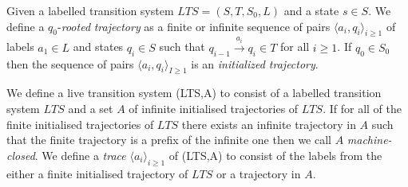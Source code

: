 \begin{figure} [h!]
\begin{center}
\end{center}

\label{fig:RBCAuton}
\end{figure}
\medskip
\begin{mydef}
Given a labelled transition system $LTS = (S,T,S_0,L)$ and a state $s \in S$. We define a $q_0$-\emph{rooted} \emph{trajectory} as a finite or infinite sequence of pairs $\langle a_i, q_i \rangle_{i \geq 1}$ of labels $a_1 \in L$ and states $q_i \in S$  such that $q_{i-1} \xrightarrow{a_i} q_{i} \in T$ for all $i \geq 1$. If $q_0 \in S_0$ then the sequence of pairs $\langle a_i, q_i \rangle_{I \geq 1}$ is an \emph{initialized trajectory}. 
\end{mydef}
\medskip
\begin{mydef}
We define a live transition system (LTS,A) to consist of a labelled transition system $LTS$ and a set $A$ of infinite initialised trajectories of $LTS$. If for all of the finite initialised trajectories of $LTS$ there exists an infinite trajectory in $A$ such that the finite trajectory is a prefix of the infinite one then we call $A$ \emph{machine-closed}. We define a \emph{trace} $\langle a_i \rangle_{i \geq 1}$ of (LTS,A) to consist of the labels from the either a finite initialised trajectory of $LTS$ or a trajectory in $A$.
\end{mydef}
\medskip

